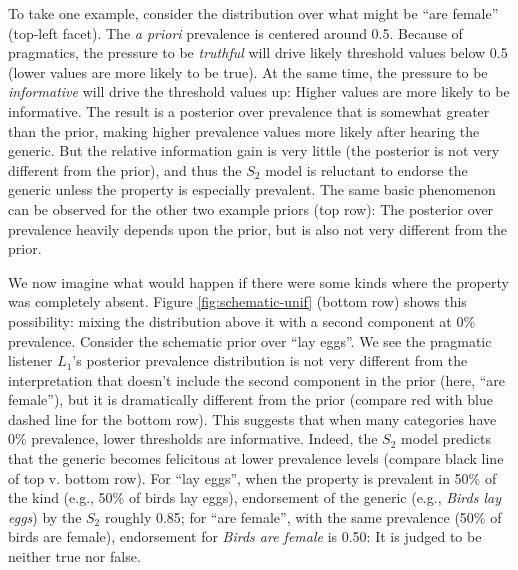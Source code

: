 \documentclass[12pt,letterpaper]{article}
\begin{document}
To take one example, consider the distribution over what might be ``are female'' (top-left facet).
The \emph{a priori} prevalence is centered around 0.5.
Because of pragmatics, the pressure to be \emph{truthful} will drive likely threshold values below 0.5 (lower values are more likely to be true). 
At the same time, the pressure to be \emph{informative} will drive the threshold values up: Higher values are more likely to be informative. 
The result is a posterior over prevalence that is somewhat greater than the prior, making higher prevalence values more likely after hearing the generic. 
But the relative information gain is very little (the posterior is not very different from the prior), and thus the $S_2$ model is reluctant to endorse the generic unless the property is especially prevalent. 
The same basic phenomenon can be observed for the other two example priors (top row): The posterior over prevalence heavily depends upon the prior, but is also not very different from the prior. %

%


We now imagine what would happen if there were some kinds where the property was completely absent.
Figure \ref{fig:schematic-unif} (bottom row) shows this possibility: mixing the distribution above it with a second component at 0\% prevalence.
Consider the schematic prior over ``lay eggs''.
We see the pragmatic listener $L_1$'s posterior prevalence distribution is not very different from the interpretation that doesn't include the second component in the prior (here, ``are female''), but it is dramatically different from the prior (compare red with blue dashed line for the bottom row).
This suggests that when many categories have 0\% prevalence, lower thresholds are informative. 
Indeed, the $S_2$ model predicts that the generic becomes felicitous at lower prevalence levels (compare black line of top v. bottom row).
For ``lay eggs'', when the property is prevalent in 50\% of the kind (e.g., 50\% of birds lay eggs), endorsement of the generic (e.g., \emph{Birds lay eggs}) by the $S_2$ roughly 0.85; for ``are female'', with the same prevalence (50\% of birds are female), endorsement for \emph{Birds are female} is 0.50: It is judged to be neither true nor false.
\end{document}
